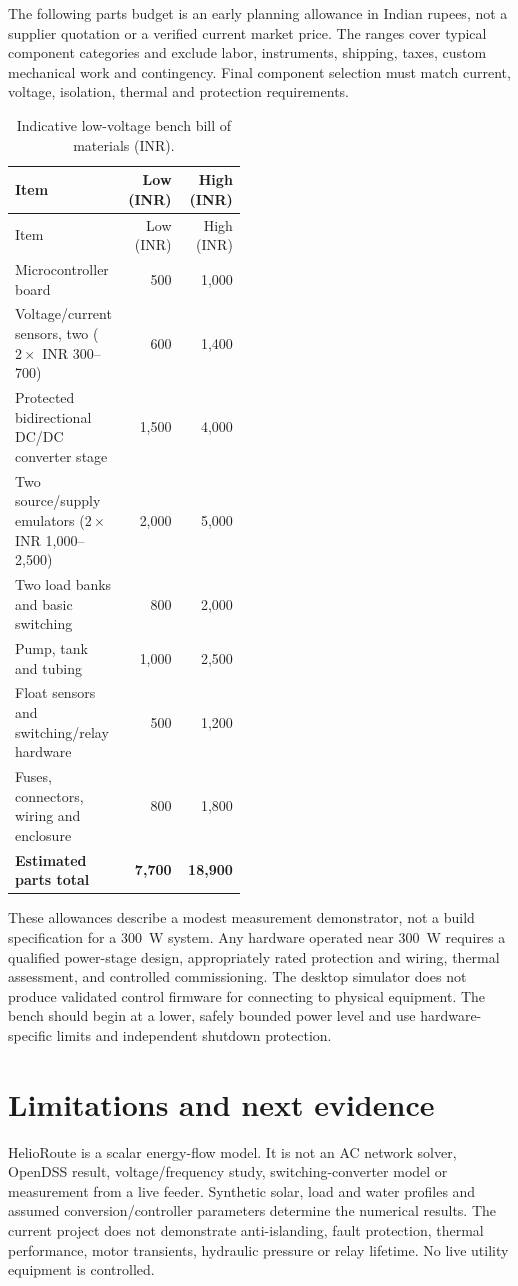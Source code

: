 \documentclass[11pt]{article}
\begin{document}
The following parts budget is an early planning allowance in Indian rupees, not a supplier quotation or a verified current market price. The ranges cover typical component categories and exclude labor, instruments, shipping, taxes, custom mechanical work and contingency. Final component selection must match current, voltage, isolation, thermal and protection requirements.

\begin{longtable}{p{0.46\linewidth}rr}
\caption{Indicative low-voltage bench bill of materials (INR).}\label{tab:bom}\\
\toprule
Item & Low (INR) & High (INR)\\
\midrule
\endfirsthead
\toprule
Item & Low (INR) & High (INR)\\
\midrule
\endhead
Microcontroller board & 500 & 1,000\\
Voltage/current sensors, two ($2\times$ INR 300--700) & 600 & 1,400\\
Protected bidirectional DC/DC converter stage & 1,500 & 4,000\\
Two source/supply emulators ($2\times$ INR 1,000--2,500) & 2,000 & 5,000\\
Two load banks and basic switching & 800 & 2,000\\
Pump, tank and tubing & 1,000 & 2,500\\
Float sensors and switching/relay hardware & 500 & 1,200\\
Fuses, connectors, wiring and enclosure & 800 & 1,800\\
\midrule
\textbf{Estimated parts total} & \textbf{7,700} & \textbf{18,900}\\
\bottomrule
\end{longtable}

These allowances describe a modest measurement demonstrator, not a build specification for a 300~W system. Any hardware operated near 300~W requires a qualified power-stage design, appropriately rated protection and wiring, thermal assessment, and controlled commissioning. The desktop simulator does not produce validated control firmware for connecting to physical equipment. The bench should begin at a lower, safely bounded power level and use hardware-specific limits and independent shutdown protection.

\section{Limitations and next evidence}
HelioRoute is a scalar energy-flow model. It is not an AC network solver, OpenDSS result, voltage/frequency study, switching-converter model or measurement from a live feeder. Synthetic solar, load and water profiles and assumed conversion/controller parameters determine the numerical results. The current project does not demonstrate anti-islanding, fault protection, thermal performance, motor transients, hydraulic pressure or relay lifetime. No live utility equipment is controlled.
\end{document}
